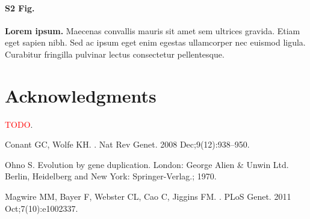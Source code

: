 \documentclass[10pt,letterpaper]{article}
\begin{document}
\paragraph*{S2 Fig.}
\label{S2_Fig}
{\bf Lorem ipsum.} Maecenas convallis mauris sit amet sem ultrices gravida. Etiam eget sapien nibh. Sed ac ipsum eget enim egestas ullamcorper nec euismod ligula. Curabitur fringilla pulvinar lectus consectetur pellentesque.

\section*{Acknowledgments}
\textcolor{red}{TODO}.

\nolinenumbers

%
%
% 
\begin{thebibliography}{10}

Conant GC, Wolfe KH.
.
\newblock Nat Rev Genet. 2008 Dec;9(12):938--950.

Ohno S.
\newblock Evolution by gene duplication.
\newblock London: George Alien \& Unwin Ltd. Berlin, Heidelberg and New York:
  Springer-Verlag.; 1970.

Magwire MM, Bayer F, Webster CL, Cao C, Jiggins FM.
.
\newblock PLoS Genet. 2011 Oct;7(10):e1002337.

\end{thebibliography}
\newpage 
\end{document}
